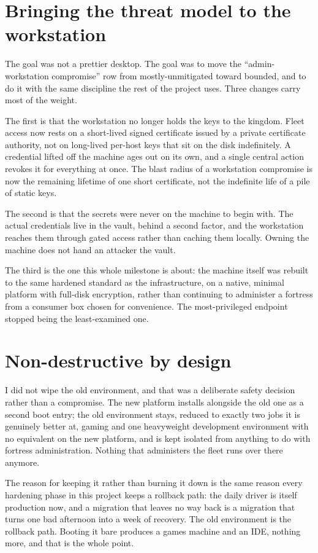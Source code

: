 \documentclass[12pt]{article}
\begin{document}
\section{Bringing the threat model to the workstation}

The goal was not a prettier desktop. The goal was to move the ``admin-workstation compromise'' row from mostly-unmitigated toward bounded, and to do it with the same discipline the rest of the project uses. Three changes carry most of the weight.

The first is that the workstation no longer holds the keys to the kingdom. Fleet access now rests on a short-lived signed certificate issued by a private certificate authority, not on long-lived per-host keys that sit on the disk indefinitely. A credential lifted off the machine ages out on its own, and a single central action revokes it for everything at once. The blast radius of a workstation compromise is now the remaining lifetime of one short certificate, not the indefinite life of a pile of static keys.

The second is that the secrets were never on the machine to begin with. The actual credentials live in the vault, behind a second factor, and the workstation reaches them through gated access rather than caching them locally. Owning the machine does not hand an attacker the vault.

The third is the one this whole milestone is about: the machine itself was rebuilt to the same hardened standard as the infrastructure, on a native, minimal platform with full-disk encryption, rather than continuing to administer a fortress from a consumer box chosen for convenience. The most-privileged endpoint stopped being the least-examined one.

\section{Non-destructive by design}

I did not wipe the old environment, and that was a deliberate safety decision rather than a compromise. The new platform installs alongside the old one as a second boot entry; the old environment stays, reduced to exactly two jobs it is genuinely better at, gaming and one heavyweight development environment with no equivalent on the new platform, and is kept isolated from anything to do with fortress administration. Nothing that administers the fleet runs over there anymore.

The reason for keeping it rather than burning it down is the same reason every hardening phase in this project keeps a rollback path: the daily driver is itself production now, and a migration that leaves no way back is a migration that turns one bad afternoon into a week of recovery. The old environment is the rollback path. Booting it bare produces a games machine and an IDE, nothing more, and that is the whole point.
\end{document}
